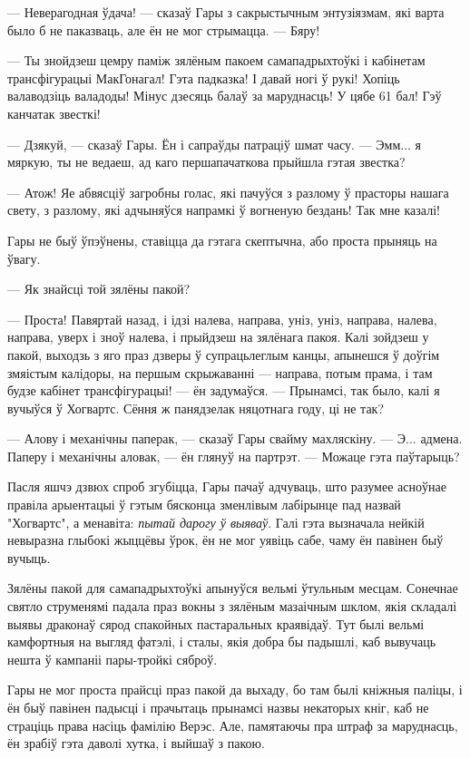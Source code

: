 --- Неверагодная ўдача! --- сказаў Гары з  сакрыстычным энтузіязмам, які варта было б
не паказваць, але ён не мог стрымацца. --- Бяру!   

--- Ты знойдзеш цемру паміж зялёным пакоем самападрыхтоўкі і кабінетам трансфігурацыі МакГонагал!
Гэта падказка! І давай ногі ў рукі! Хопіць валаводзіць валадоды! Мінус дзесяць балаў
за маруднасць! У цябе 61 бал! Гэў канчатак звесткі!

--- Дзякуй, --- сказаў Гары. Ён і сапраўды патраціў шмат часу. --- Эмм... я 
мяркую, ты не ведаеш, ад каго першапачаткова прыйшла гэтая звестка?

--- Атож! Яе абвясціў загробны голас, які пачуўся з разлому ў прасторы нашага свету,
з разлому, які адчыняўся напрамкі ў вогненую бездань! Так мне казалі!

Гары не быў ўпэўнены, ставіцца да гэтага скептычна, або проста прыняць на ўвагу. 

--- Як знайсці той зялёны пакой?

--- Проста! Павяртай назад, і ідзі налева, направа, уніз, уніз, направа, налева, направа,
уверх і зноў налева, і прыйдзеш на зялёнага пакоя. Калі зойдзеш у пакой, выходзь 
з яго праз дзверы ў супрацьлеглым канцы, апынешся ў доўгім змяістым калідоры, на 
першым скрыжаванні --- направа, потым прама, і там будзе кабінет трансфігурацыі! ---
ён задумаўся. --- Прынамсі, так было, калі я вучыўся ў Хогвартс. Сёння ж 
панядзелак няцотнага году, ці не так?

--- Алову і механічны паперак, --- сказаў Гары свайму махляскіну. --- Э...
адмена. Паперу і механічны аловак, --- ён глянуў на партрэт. --- Можаце гэта паўтарыць?

Пасля яшчэ дзвюх спроб згубіцца, Гары пачаў адчуваць, што разумее асноўнае
правіла арыентацыі ў гэтым бясконца зменлівым лабірынце пад назвай "Хогвартс",
а менавіта: \emph{пытай дарогу ў выяваў}. Галі гэта вызначала нейкій невыразна
глыбокі жыццёвы ўрок, ён не мог уявіць сабе, чаму ён павінен быў вучыць.

Зялёны пакой для самападрыхтоўкі апынуўся вельмі ўтульным месцам. Сонечнае святло 
струменямі падала праз вокны з зялёным мазаічным шклом, якія складалі выявы драконаў
сярод спакойных пастаральных краявідаў. Тут былі вельмі камфортныя на выгляд фатэлі,
і сталы, якія добра бы падышлі, каб вывучаць нешта ў кампаніі пары-тройкі сяброў.

Гары не мог проста прайсці праз пакой да выхаду, бо там былі кніжныя паліцы, 
і ён быў павінен падысці і прачытаць прынамсі назвы некаторых кніг, каб 
не страціць права насіць фамілію Верэс. Але, памятаючы пра штраф за маруднасць,
ён зрабіў гэта даволі хутка, і выйшаў з пакою.

